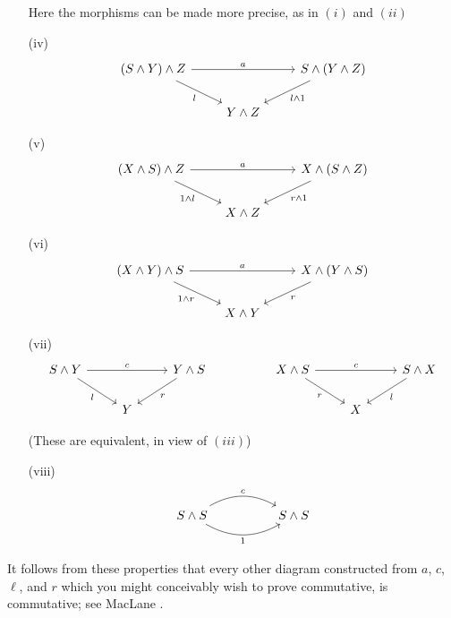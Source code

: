 \documentclass[../main]{subfiles}
\begin{document}
\begin{enumerate}
    Here the morphisms can be made more precise, as in $(i)$ and $(ii)$
    \item[(iv)] \[\begin{tikzcd}
	{(S\wedge Y)\wedge Z} && {S\wedge(Y\wedge Z)} \\
	& {Y\wedge Z}
	\arrow["a", from=1-1, to=1-3]
	\arrow["l"', from=1-1, to=2-2]
	\arrow["l\wedge 1", from=1-3, to=2-2]
    \end{tikzcd}\]
    \item[(v)]\[\begin{tikzcd}
	{(X\wedge S)\wedge Z} && {X\wedge(S\wedge Z)} \\
	& {X\wedge Z}
	\arrow["a", from=1-1, to=1-3]
	\arrow["1\wedge l"', from=1-1, to=2-2]
	\arrow["r\wedge 1", from=1-3, to=2-2]
    \end{tikzcd}\]
    \item[(vi)]\[\begin{tikzcd}
	{(X\wedge Y)\wedge S} && {X\wedge(Y\wedge S)} \\
	& {X\wedge Y}
	\arrow["a", from=1-1, to=1-3]
	\arrow["1\wedge r"', from=1-1, to=2-2]
	\arrow["r", from=1-3, to=2-2]
    \end{tikzcd}\]
    \item[(vii)]\[\begin{tikzcd}
	{S\wedge Y} && {Y\wedge S} && {X\wedge S} && {S\wedge X} \\
	& Y &&&& X
	\arrow["c", from=1-1, to=1-3]
	\arrow["l"', from=1-1, to=2-2]
	\arrow["r", from=1-3, to=2-2]
	\arrow["c", from=1-5, to=1-7]
	\arrow["r"', from=1-5, to=2-6]
	\arrow["l", from=1-7, to=2-6]
    \end{tikzcd}\]
    
    (These are equivalent, in view of $(iii)$)
    \item[(viii)] \[\begin{tikzcd}
	{S\wedge S} && {S\wedge S}
	\arrow["c", bend left=30, from=1-1, to=1-3]
	\arrow["1"', bend right=30, from=1-1, to=1-3]
    \end{tikzcd}\]
\end{enumerate}



It follows from these properties that every other diagram constructed from $a$, $c$, $\ell$, and $r$ which you might conceivably wish to prove commutative, is commutative; see MacLane \cite{maclane}.
\end{document}

